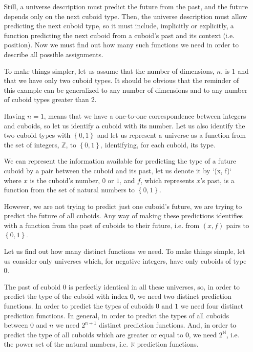 \documentclass[a4paper
]{article}
\def\reale{\mathbb{R}}
\def\intregi{\mathbb{Z}}
\def\naturale{\mathbb{N}}
\newcommand{\multime}[1]{\left\{ #1 \right\}}
\begin{document}
Still, a universe description must predict the future from the past, and
the future depends only on the next cuboid type. Then, the universe
description must allow predicting the next cuboid type, so it must include,
implicitly or explicitly,
a function predicting the next cuboid from a cuboid's past
and its context (i.e. position). Now we must find out how many such functions
we need in order to describe all possible assignments.

To make things simpler, let us assume that the number of dimensions, $n$,
is $1$ and that we have only two cuboid types.
It should be obvious that
the reminder of this example can be generalized to any number of dimensions
and to any number of cuboid types greater than $2$.

Having $n=1$, means that we have a one-to-one correspondence between
integers and cuboids, so let us identify a cuboid with its number.
Let us also identify the two cuboid types with $\multime{0, 1}$ and
let us represent a universe as a function from the set of integers, $\intregi$,
to $\multime{0, 1}$, identifying, for each cuboid, its type.

We can represent the information available for predicting the type of a future
cuboid by a pair between the cuboid and its past, let us denote it
by `(x, f)` where $x$ is the cuboid's number, $0$ or $1$,
and $f$, which represents $x$'s past, is a function from the set of natural
numbers to $\multime{0,1}$.

However, we are not trying to predict just one cuboid's future,
we are trying to predict the future of all cuboids.
Any way of making these predictions identifies with a function from the past
of cuboids to their future, i.e. from $(x, f)$ pairs to $\multime{0, 1}$.

Let us find out how many distinct functions we need.
To make things simple, let us consider only universes which, for negative
integers, have only cuboids of type $0$.

The past of cuboid $0$ is perfectly identical in all these universes, so,
in order to predict the type of the cuboid with index $0$,
we need two distinct prediction functions.
In order to predict the types of cuboids $0$ and $1$ we need four
distinct prediction functions.
In general, in order to predict the types of all cuboids between $0$ and $n$
we need $2^{n+1}$ distinct prediction functions.
And, in order to predict the type of all cuboids which are greater or equal
to $0$, we need $2^\naturale$, i.e. the power set of the natural numbers,
i.e. $\reale$ prediction functions.
\end{document}
